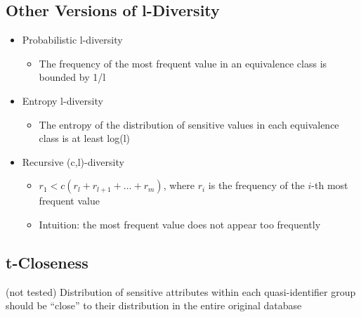\documentclass[11pt]{article}
\theoremstyle{definition}
\begin{document}
\subsection{Other Versions of l-Diversity}
\begin{itemize}
    \item Probabilistic l-diversity
    \begin{itemize}
        \item The frequency of the most frequent value in an equivalence class is bounded by 1/l
    \end{itemize}
    \item Entropy l-diversity
    \begin{itemize}
        \item The entropy of the distribution of sensitive values in each equivalence class is at least log(l)
    \end{itemize}
    \item Recursive (c,l)-diversity
    \begin{itemize}
        \item \( r_1 < c(r_l + r_{l+1} + \dots + r_m) \), where \( r_i \) is the frequency of the \( i \)-th most frequent value
        \item Intuition: the most frequent value does not appear too frequently
    \end{itemize}
\end{itemize}

\subsection{t-Closeness} 
(not tested)
Distribution of sensitive
attributes within each
quasi-identifier group should
be “close” to their distribution
in the entire original database
\end{document}
